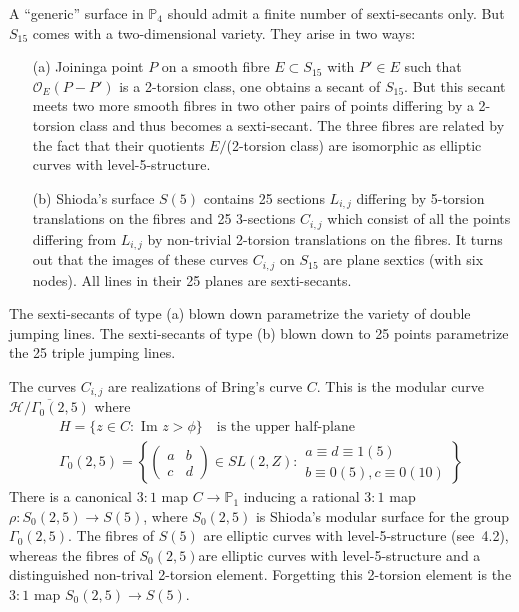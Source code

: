 A ``generic'' surface in $\mathbb{P}_{4}$ should admit a finite number
of sexti-secants only. But $S_{15}$ comes with a two-dimensional
variety. They arise in two ways:
\begin{itemize}
\item[(a)] Joining\pageoriginale a point $P$ on a smooth fibre $E\subset S_{15}$
with $P'\in E$ such that $\mathscr{O}_{E}(P-P')$ is a 2-torsion class,
one obtains a secant of $S_{15}$. But this secant meets two more
smooth fibres in two other pairs of points differing by a 2-torsion
class and thus becomes a sexti-secant. The three fibres are related by
the fact that their quotients $E/$(2-torsion class) are isomorphic as
elliptic curves with level-5-structure.

\item[(b)] Shioda's surface $S(5)$ contains 25 sections $L_{i,j}$
differing by 5-torsion translations on the fibres and 25 3-sections
$C_{i,j}$ which consist of all the points differing from $L_{i,j}$ by
non-trivial 2-torsion translations on the fibres. It turns out that
the images of these curves $C_{i,j}$ on $S_{15}$ are plane sextics
(with six nodes). All lines in their 25 planes are sexti-secants. 
\end{itemize}

The sexti-secants of type (a) blown down parametrize the variety of
double jumping lines. The sexti-secants of type (b) blown down to 25
points parametrize the 25 triple jumping lines.

The curves $C_{i,j}$ are realizations of Bring's curve $C$. This is
the modular curve $\overline{\mathscr{H}/\Gamma_{0}(2,5)}$ where 
\begin{gather*}
H=\{z\in C:\text{~Im~}z>\phi\}\quad\text{is the upper
half-plane}\\[4pt]
\Gamma_{0}(2,5)=\left\{
\begin{pmatrix}
a & b\\[3pt]
c & d
\end{pmatrix}\in SL(2,Z):\begin{array}{l}a\equiv d\equiv 1(5)\\
b\equiv 0(5), c\equiv 0(10)\end{array}\right\}
\end{gather*}
There is a canonical $3:1$ map $C\to \mathbb{P}_{1}$ inducing a
rational $3:1$ map $\rho:S_{0}(2,5)\to S(5)$, where $S_{0}(2,5)$ is
Shioda's modular surface for the group $\Gamma_{0}(2,5)$. The fibres
of $S(5)$ are elliptic curves with level-5-structure (see~4.2),
whereas the fibres of $S_{0}(2,5)$\pageoriginale are elliptic curves with
level-5-structure and a distinguished non-trival 2-torsion
element. Forgetting this 2-torsion element is the $3:1$ map
$S_{0}(2,5)\to S(5)$.

